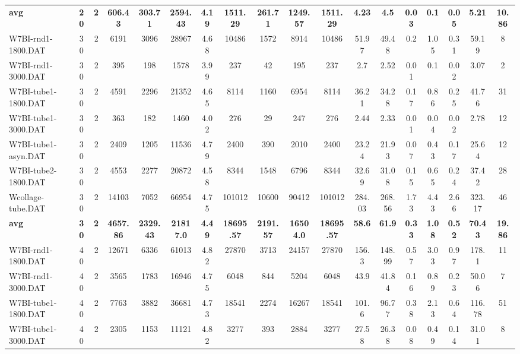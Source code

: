 \begin{sidewaystable}[h]
{\begin{tabular}{lccccccccccccccccc}
\cline{1-18} \textbf{avg} & \textbf{20} & \textbf{2} & \textbf{606.43} & \textbf{303.71} & \textbf{2594.43} & \textbf{4.19} & \textbf{1511.29} & \textbf{261.71} & \textbf{1249.57} & \textbf{1511.29} & \textbf{4.23} & \textbf{4.5} & \textbf{0.03} & \textbf{0.1} & \textbf{0.05} & \textbf{5.21} & \textbf{10.86} \\ \cline{1-18}
W7BI-rnd1-1800.DAT & 30 & 2 & 6191 & 3096 & 28967 & 4.68 & 10486 & 1572 & 8914 & 10486 & 51.97 & 49.48 & 0.2 & 1.05 & 0.31 & 59.19 & 8\\
W7BI-rnd1-3000.DAT & 30 & 2 & 395 & 198 & 1578 & 3.99 & 237 & 42 & 195 & 237 & 2.7 & 2.52 & 0.01 & 0.1 & 0.02 & 3.07 & 2\\
W7BI-tube1-1800.DAT & 30 & 2 & 4591 & 2296 & 21352 & 4.65 & 8114 & 1160 & 6954 & 8114 & 36.21 & 34.28 & 0.17 & 0.86 & 0.25 & 41.76 & 31\\
W7BI-tube1-3000.DAT & 30 & 2 & 363 & 182 & 1460 & 4.02 & 276 & 29 & 247 & 276 & 2.44 & 2.33 & 0.01 & 0.04 & 0.02 & 2.78 & 12\\
W7BI-tube1-asyn.DAT & 30 & 2 & 2409 & 1205 & 11536 & 4.79 & 2400 & 390 & 2010 & 2400 & 23.24 & 21.93 & 0.07 & 0.43 & 0.17 & 25.64 & 12\\
W7BI-tube2-1800.DAT & 30 & 2 & 4553 & 2277 & 20872 & 4.58 & 8344 & 1548 & 6796 & 8344 & 32.69 & 31.08 & 0.15 & 0.65 & 0.24 & 37.42 & 28\\
Wcollage-tube.DAT & 30 & 2 & 14103 & 7052 & 66954 & 4.75 & 101012 & 10600 & 90412 & 101012 & 284.03 & 268.56 & 1.73 & 4.43 & 2.66 & 323.17 & 46\\
\cline{1-18} \textbf{avg} & \textbf{30} & \textbf{2} & \textbf{4657.86} & \textbf{2329.43} & \textbf{21817.0} & \textbf{4.49} & \textbf{18695.57} & \textbf{2191.57} & \textbf{16504.0} & \textbf{18695.57} & \textbf{58.6} & \textbf{61.9} & \textbf{0.33} & \textbf{1.08} & \textbf{0.52} & \textbf{70.43} & \textbf{19.86} \\ \cline{1-18}
W7BI-rnd1-1800.DAT & 40 & 2 & 12671 & 6336 & 61013 & 4.82 & 27870 & 3713 & 24157 & 27870 & 156.3 & 148.99 & 0.57 & 3.03 & 0.97 & 178.1 & 11\\
W7BI-rnd1-3000.DAT & 40 & 2 & 3565 & 1783 & 16946 & 4.75 & 6048 & 844 & 5204 & 6048 & 43.9 & 41.84 & 0.16 & 0.89 & 0.23 & 50.06 & 7\\
W7BI-tube1-1800.DAT & 40 & 2 & 7763 & 3882 & 36681 & 4.73 & 18541 & 2274 & 16267 & 18541 & 101.6 & 96.77 & 0.38 & 2.13 & 0.64 & 116.78 & 51\\
W7BI-tube1-3000.DAT & 40 & 2 & 2305 & 1153 & 11121 & 4.82 & 3277 & 393 & 2884 & 3277 & 27.58 & 26.38 & 0.08 & 0.49 & 0.14 & 31.01 & 8\\

\end{tabular}}
\end{sidewaystable}
